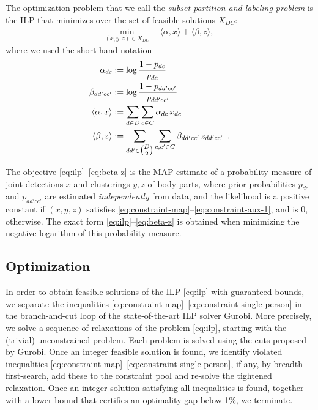 The optimization problem that we call the \emph{subset partition and labeling problem} is the ILP that minimizes over the set of feasible solutions $X_{DC}$:
%
\begin{align}
\min_{(x,y,z) \in X_{DC}} \ \
    & \langle \alpha, x \rangle + \langle \beta, z \rangle,
    \label{eq:ilp}
\end{align}
%
where we used the short-hand notation
%
\begin{align}
\alpha_{dc}
    & := \log \frac{1 - p_{dc}}{p_{dc}}
    \label{eq:cost-definition-1} \\
\beta_{dd'cc'}
    & := \log \frac{1 - p_{dd'cc'}}{p_{dd'cc'}}
    \label{eq:cost-definition-2}\\
\langle \alpha, x \rangle
    & := \sum_{d \in D} \sum_{c \in C} \alpha_{dc} \, x_{dc}\\
\langle \beta, z \rangle
    & := \sum_{d d' \in \tbinom{D}{2}} \sum_{c,c' \in C} \beta_{dd'cc'} \, z_{dd'cc'}
\enspace .
\label{eq:beta-z}
\end{align}

The objective \eqref{eq:ilp}--\eqref{eq:beta-z} is the MAP estimate of
a probability measure of joint detections $x$ and clusterings $y,z$ of
body parts, where prior probabilities $p_{dc}$ and $p_{dd'cc'}$ are
estimated \emph{independently} from data, and the likelihood is a
positive constant if $(x,y,z)$ satisfies
\eqref{eq:constraint-map}--\eqref{eq:constraint-aux-1}, and is 0,
otherwise. The exact form \eqref{eq:ilp}--\eqref{eq:beta-z} is
obtained when minimizing the negative logarithm of this probability measure.

\subsection{Optimization}
%
In order to obtain feasible solutions of the ILP
\eqref{eq:ilp}
with guaranteed bounds,
we separate the inequalities \eqref{eq:constraint-map}--\eqref{eq:constraint-single-person}
in the branch-and-cut loop of the state-of-the-art ILP solver Gurobi.
More precisely, we solve a sequence of relaxations of the problem
\eqref{eq:ilp},
starting with the (trivial) unconstrained problem.
Each problem is solved using the cuts proposed by Gurobi.
Once an integer feasible solution is found,
we identify violated inequalities
\eqref{eq:constraint-map}--\eqref{eq:constraint-single-person},
if any, by breadth-first-search, add these to the constraint pool and re-solve the tightened relaxation.
Once an integer solution satisfying all inequalities is found,
together with a lower bound that certifies an optimality gap below 1\%,
we terminate.
